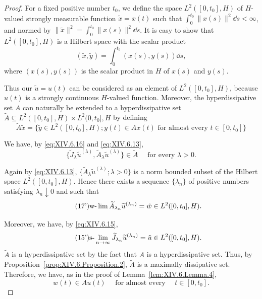 \begin{proof}
 For a fixed positive number $t_0$, we define the space $L^2([0, t_0], H)$ of $H$-valued strongly measurable function $\tilde{x} = x(t)$ such that $\int_{0}^{t_0} \|x(s)\|^2 \dd s < \infty$, and normed by $\|\tilde{x}\|^2 = \int_{0}^{t_0} \|x(s)\|^2 \dd s$. It is easy to show that $L^2([0, t_0], H)$ is a Hilbert space with the scalar product 
\begin{equation}\label{eq:XIV.6.21}
(\tilde {x}, \tilde {y}) = \int_{0} ^ {t _{0}} (x (s), y (s)) \dd s,
\end{equation}
where $(x(s), y(s))$ is the scalar product in $H$ of $x(s)$ and $y(s)$. 

Thus our $\tilde{u} = u(t)$ can be considered as an element of $L^2([0, t_0], H)$, because $u(t)$ is a strongly continuous $H$-valued function. Moreover, the hyperdissipative set $A$ can naturally be extended to a hyperdissipative set $\tilde{A} \subseteq L^2([0, t_0], H) \times L^2(0, t_0], H$ by defining 
\begin{equation}\label{eq:XIV.6.22}
\tilde {A} \tilde {x} = \{\tilde {y} \in L ^{2} ([ 0, t _{0} ], H); y (t) \in A x (t) \text{ for almost every } t \in [ 0, t _{0} ] \}
\end{equation}

We have, by \eqref{eq:XIV.6.16} and \eqref{eq:XIV.6.13}, 
\begin{equation}\tag{16'}\label{eq:XIV.6.16'}
\{\widetilde {J} _{\lambda} \widetilde {u} ^{(\lambda)}, \widetilde {A} _{\lambda} \widetilde {u} ^{(\lambda)} \} \in \tilde {A} \quad \text{ for every } \lambda > 0.
\end{equation}

Again by \eqref{eq:XIV.6.13}, $\{\widetilde{A}_{\lambda}\widetilde{u}^{(\lambda)};\lambda >0\}$ is a norm bounded subset of the Hilbert space $L^2 ([0,t_0],H)$. Hence there exists a sequence $\{\lambda_n\}$ of positive numbers satisfying $\lambda_{n}\downarrow 0$ and such that 
\begin{equation}\tag{17'}\label{eq:XIV.6.17'}
\text{w-}\lim \widetilde {A} _ {\lambda_{n}} \widetilde {u} ^ {(\lambda_{n})} = \tilde {w} \in L ^{2} ([ 0, t _{0} ], H) .
\end{equation}

Moreover, we have, by \eqref{eq:XIV.6.15}, 
\begin{equation}\tag{15'}\label{eq:XIV.6.15'}
\text{s-}\lim _{n \rightarrow \infty} \widetilde {J} _ {\lambda_{n}} \widetilde {u} ^ {(\lambda_{n})} = \tilde {u} \in L ^{2} ([ 0, t _{0} ], H).
\end{equation}
$\tilde{A}$ is a hyperdissipative set by the fact that $A$ is a hyperdissipative set. Thus, by Proposition~\ref{prop:XIV.6.Proposition.2}, $\tilde{A}$ is a maximally dissipative set. Therefore, we have, as in the proof of Lemma~\ref{lem:XIV.6.Lemma.4}, 
\begin{equation}\tag{18'}\label{eq:XIV.6.18'}
w (t) \in A u (t) \quad \text{ for almost every } \quad t \in [ 0, t _{0} ] .
\end{equation}


\end{proof}
